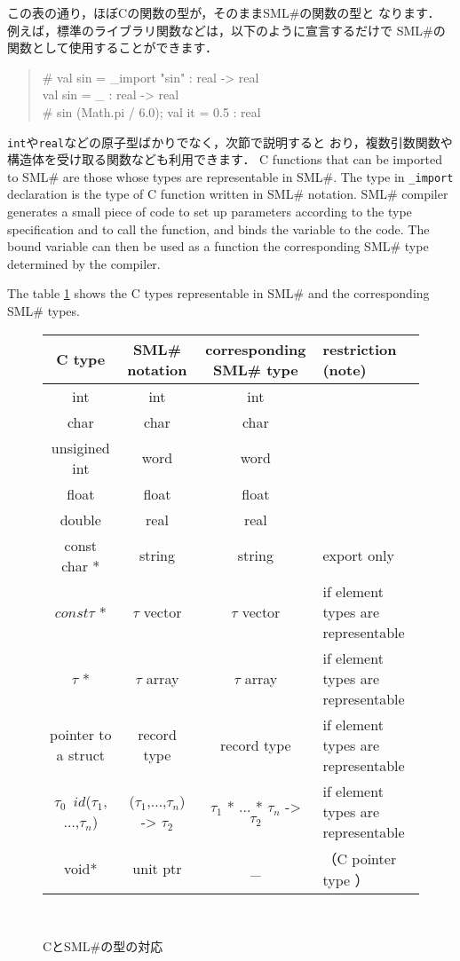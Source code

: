 \documentclass{jbook}
\newcommand{\smlsharp}{SML\#}
\newenvironment{program}{\begin{tt}\begin{quote}}{\end{quote}\end{tt}}
\begin{document}
	この表の通り，ほぼCの関数の型が，そのまま\smlsharp{}の関数の型と
なります．
	例えば，標準のライブラリ関数などは，以下のように宣言するだけで
\smlsharp{}の関数として使用することができます．
\begin{program}
\# val sin = \_import "sin" : real -> real\\
val sin = \_ : real -> real\\
\# sin (Math.pi / 6.0);
val it = 0.5 : real
\end{program}
	{\tt int}や{\tt real}などの原子型ばかりでなく，次節で説明すると
おり，複数引数関数や構造体を受け取る関数なども利用できます．
\else%
	C functions that can be imported to \smlsharp{} are those whose
types are representable in \smlsharp{}.
	The type in {\tt \_import} declaration is the type of C function
written in \smlsharp{} notation.
	\smlsharp{} compiler generates a small piece of code to set up
parameters according to the type specification and to call the function,
and binds the variable to the code.
	The bound variable can then be used as a function the
corresponding \smlsharp{} type determined by the compiler.

	The table \ref{fig:interoperableType} shows 
the C types representable in \smlsharp{} and the corresponding
\smlsharp{} types.
\begin{figure}
\begin{center}
\begin{tabular}{|c|c|c|l|}
\hline
C type & \smlsharp{} notation & corresponding \smlsharp{} type & restriction (note)
\\ \hline
int & int & int & 
\\
char & char &char &
\\
unsigined int & word &word &
\\
float & float &float &
\\
double & real &real &
\\
const char * & string &string & export only
\\
$const \tau$ * & $\tau$ vector & $\tau$ vector & 
if element types are representable
\\
$\tau$ * & $\tau$ array & $\tau$ array & if element types are representable
\\
pointer to a struct & record type & record type & if element types are representable
\\
$\tau_0$\ $id$($\tau_1$,$\ldots$,$\tau_n$) & 
($\tau_1$,$\ldots$,$\tau_n$) -> $\tau_2$ & 
$\tau_1$ * $\ldots$ * $\tau_n$ -> $\tau_2$ & 
if element types are representable
\\
void* & unit ptr & \_ & （C pointer type ）
\\\hline
\end{tabular}\\
\caption{Cと\smlsharp{}の型の対応}
\label{fig:interoperableType}
\end{center}
\end{figure}
\end{document}
